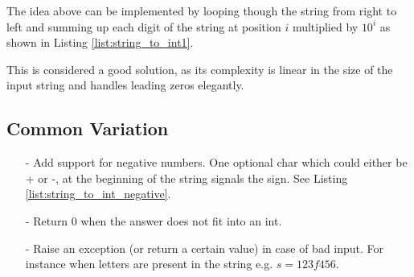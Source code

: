 The idea above can be implemented by looping though the string from right to left and summing up each digit of the string at position $i$  multiplied by $10^i$ as shown in Listing \ref{list:string_to_int1}.




This is considered a good solution, as its complexity is linear in the size of the input string and handles leading zeros elegantly.

\subsection{Common Variation}
\begin{itemize}
	\item[-] Add support for negative numbers. One optional char which could either be + or -, at the beginning of the string  signals the sign. See Listing \ref{list:string_to_int_negative}.
	\item[-] Return $0$ when the answer does not fit into an int.
	\item[-] Raise an exception (or return a certain value) in case of bad input. For instance when letters are present in the string e.g. $s=123f456$.  
\end{itemize}

